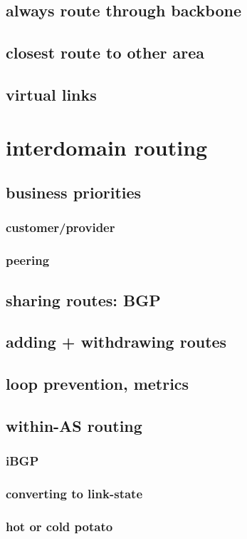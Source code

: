 \subsection{always route through backbone}

\subsection{closest route to other area}

\subsection{virtual links}

\section{interdomain routing}

\subsection{business priorities}

\subsubsection{customer/provider}

\subsubsection{peering}

\subsection{sharing routes: BGP}

\subsection{adding + withdrawing routes}

\subsection{loop prevention, metrics}

\subsection{within-AS routing}

\subsubsection{iBGP}


\subsubsection{converting to link-state}

\subsubsection{hot or cold potato}
